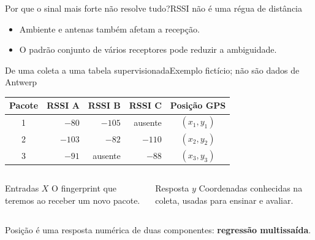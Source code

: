 \documentclass[aspectratio=169,10pt]{beamer}
\begin{document}
\begin{frame}{Por que o sinal mais forte não resolve tudo?}{RSSI não é uma régua de distância}
\centering
{}
\begin{itemize}
\item Ambiente e antenas também afetam a recepção.
\item O padrão conjunto de vários receptores pode reduzir a ambiguidade.
\end{itemize}
\end{frame}

\begin{frame}{De uma coleta a uma tabela supervisionada}{Exemplo fictício; não são dados de Antwerp}
\centering
\begin{tabular}{c r r r c}
\toprule
Pacote & RSSI A & RSSI B & RSSI C & Posição GPS\\
\midrule
1 & $-80$ & $-105$ & ausente & $(x_1,y_1)$\\
2 & $-103$ & $-82$ & $-110$ & $(x_2,y_2)$\\
3 & $-91$ & ausente & $-88$ & $(x_3,y_3)$\\
\bottomrule
\end{tabular}
\vspace{4mm}
\begin{columns}[T]
\begin{block}{Entradas $X$}
O fingerprint que teremos ao receber um novo pacote.
\end{block}
\begin{block}{Resposta $y$}
Coordenadas conhecidas na coleta, usadas para ensinar e avaliar.
\end{block}
\end{columns}
Posição é uma resposta numérica de duas componentes: \textbf{regressão multissaída}.
\end{frame}
\end{document}
